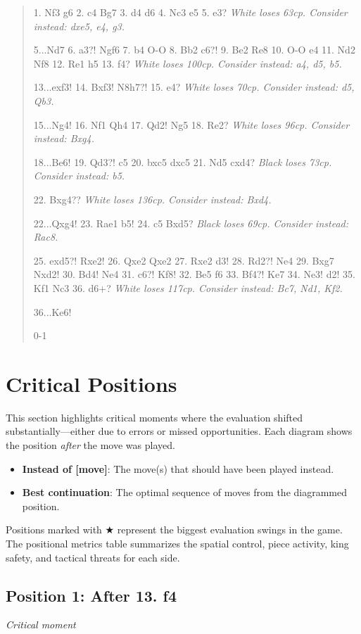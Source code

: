 \documentclass[11pt]{book}
\begin{document}
\begin{quote}
1. Nf3 g6
2. c4 Bg7
3. d4 d6
4. Nc3 e5
5. e3?
\textit{White loses 63cp. Consider instead: dxe5, e4, g3.}

5...Nd7
6. a3?! Ngf6
7. b4 O-O
8. Bb2 c6?!
9. Be2 Re8
10. O-O e4
11. Nd2 Nf8
12. Re1 h5
13. f4?
\textit{White loses 100cp. Consider instead: a4, d5, b5.}

13...exf3!
14. Bxf3! N8h7?!
15. e4?
\textit{White loses 70cp. Consider instead: d5, Qb3.}

15...Ng4!
16. Nf1 Qh4
17. Qd2! Ng5
18. Re2?
\textit{White loses 96cp. Consider instead: Bxg4.}

18...Be6!
19. Qd3?! c5
20. bxc5 dxc5
21. Nd5 cxd4?
\textit{Black loses 73cp. Consider instead: b5.}

22. Bxg4??
\textit{White loses 136cp. Consider instead: Bxd4.}

22...Qxg4!
23. Rae1 b5!
24. c5 Bxd5?
\textit{Black loses 69cp. Consider instead: Rac8.}

25. exd5?! Rxe2!
26. Qxe2 Qxe2
27. Rxe2 d3!
28. Rd2?! Ne4
29. Bxg7 Nxd2!
30. Bd4! Ne4
31. c6?! Kf8!
32. Be5 f6
33. Bf4?! Ke7
34. Ne3! d2!
35. Kf1 Nc3
36. d6+?
\textit{White loses 117cp. Consider instead: Bc7, Nd1, Kf2.}

36...Ke6!

0-1
\end{quote}

\section{Critical Positions}

This section highlights critical moments where the evaluation shifted substantially---either due to errors or missed opportunities. Each diagram shows the position \emph{after} the move was played.

\begin{itemize}
\item \textbf{Instead of [move]}: The move(s) that should have been played instead.
\item \textbf{Best continuation}: The optimal sequence of moves from the diagrammed position.
\end{itemize}

Positions marked with {\color{blue}$\bigstar$} represent the biggest evaluation swings in the game. The positional metrics table summarizes the spatial control, piece activity, king safety, and tactical threats for each side.

\subsection*{Position 1: After 13. f4}
\textit{Critical moment}
\end{document}

